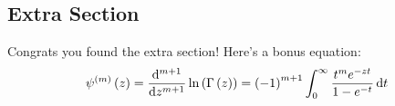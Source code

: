 \subsection{Extra Section}
Congrats you found the extra section! Here's a bonus equation:
\begin{equation}\label{eq:bonus}
    \psi^{\left( m \right)} \left( z \right) = \odv*[order={m + 1}]{\ln{\left( \Gamma\left( z \right) \right)}}{z} = \left( -1 \right)^{m + 1} \int_0^\infty \frac{t^m e^{-zt}}{1 - e^{-t}} \odif{t}
\end{equation}
